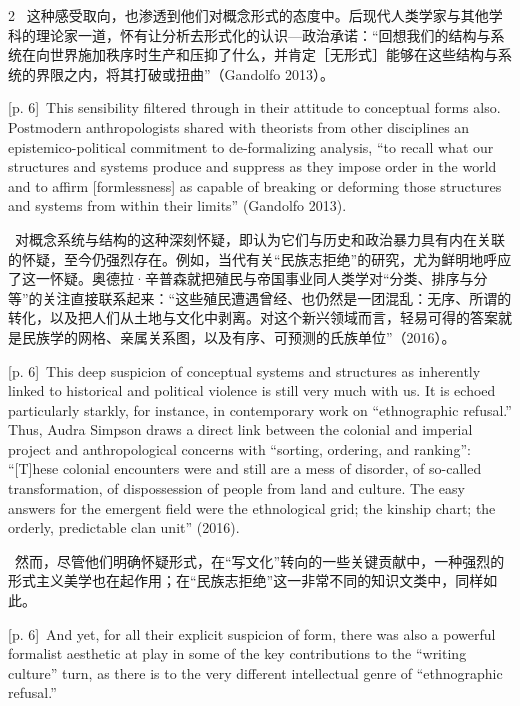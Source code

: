 \documentclass[10pt,a4paper]{article}
\begin{document}
\begin{paracol}{2}
\switchcolumn*
{\scriptsize\color{gray} [p. 6]}\ 这种感受取向，也渗透到他们对概念形式的态度中。后现代人类学家与其他学科的理论家一道，怀有让分析去形式化的认识—政治承诺：“回想我们的结构与系统在向世界施加秩序时生产和压抑了什么，并肯定［无形式］能够在这些结构与系统的界限之内，将其打破或扭曲”（Gandolfo 2013）。\par
\switchcolumn
{\scriptsize\color{gray} [p. 6]}\ This sensibility filtered through in their attitude to conceptual forms also. Postmodern anthropologists shared with theorists from other disciplines an epistemico-political commitment to de-formalizing analysis, “to recall what our structures and systems produce and suppress as they impose order in the world and to affirm [formlessness] as capable of breaking or deforming those structures and systems from within their limits” (Gandolfo 2013).\par
\switchcolumn*
{\scriptsize\color{gray} [p. 6]}\ 对概念系统与结构的这种深刻怀疑，即认为它们与历史和政治暴力具有内在关联的怀疑，至今仍强烈存在。例如，当代有关“民族志拒绝”的研究，尤为鲜明地呼应了这一怀疑。奥德拉·辛普森就把殖民与帝国事业同人类学对“分类、排序与分等”的关注直接联系起来：“这些殖民遭遇曾经、也仍然是一团混乱：无序、所谓的转化，以及把人们从土地与文化中剥离。对这个新兴领域而言，轻易可得的答案就是民族学的网格、亲属关系图，以及有序、可预测的氏族单位”（2016）。\par
\switchcolumn
{\scriptsize\color{gray} [p. 6]}\ This deep suspicion of conceptual systems and structures as inherently linked to historical and political violence is still very much with us. It is echoed particularly starkly, for instance, in contemporary work on “ethnographic refusal.” Thus, Audra Simpson draws a direct link between the colonial and imperial project and anthropological concerns with “sorting, ordering, and ranking”: “[T]hese colonial encounters were and still are a mess of disorder, of so-called transformation, of dispossession of people from land and culture. The easy answers for the emergent field were the ethnological grid; the kinship chart; the orderly, predictable clan unit” (2016).\par
\switchcolumn*
{\scriptsize\color{gray} [p. 6]}\ 然而，尽管他们明确怀疑形式，在“写文化”转向的一些关键贡献中，一种强烈的形式主义美学也在起作用；在“民族志拒绝”这一非常不同的知识文类中，同样如此。\par
\switchcolumn
{\scriptsize\color{gray} [p. 6]}\ And yet, for all their explicit suspicion of form, there was also a powerful formalist aesthetic at play in some of the key contributions to the “writing culture” turn, as there is to the very different intellectual genre of “ethnographic refusal.”\par

\end{paracol}
\end{document}
